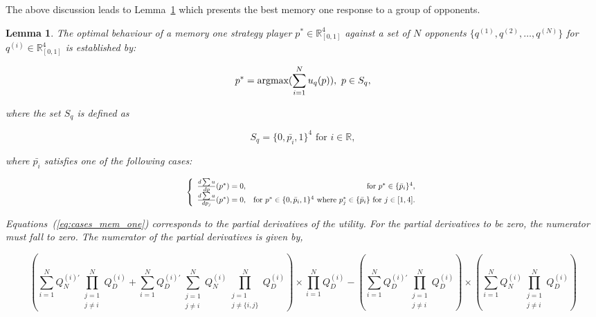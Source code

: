 \documentclass[10pt]{article}
\newcommand{\R}{\mathbb{R}}
\newtheorem{lemma}[theorem]{Lemma}
\begin{document}
The above discussion leads to Lemma~\ref{lemma:memone_group_best_response} which
presents the best memory one response to a group of opponents.

\begin{lemma}\label{lemma:memone_group_best_response}
    The optimal behaviour of a memory one strategy player \(p^* \in \R_{[0, 1]} ^ 4\)
    against a set of \(N\) opponents \(\{q^{(1)}, q^{(2)}, \dots, q^{(N)} \}\)
    for \(q^{(i)} \in \R_{[0, 1]} ^ 4\) is established by:
    
    \[p^* = \textnormal{argmax}(\sum\limits_{i=1} ^ N  u_q(p)), \ p \in S_q,\]
    
    where the set \(S_q\) is defined as 
    
    \[S_q = \{0, \bar{p_i}, 1 \}^4 \text{ for } i \in \R,\]
    
    where \(\bar{p_i}\) satisfies one of the following cases:

    \begin{equation}\label{eq:cases_mem_one}\resizebox{.7\hsize}{!}{$
        \left\{\begin{array}{lr}
        \frac{d\sum u}{dp} (p^*) = 0, & \text{for } p^* \in \{\bar{p}_i\} ^ 4, \\
        \frac{d\sum u}{dp_j} (p^*) = 0, & \text{for } p^* \in \{0, \bar{p}_i, 1\} ^ 4
        \text{ where } p_j ^ * \in \{\bar{p}_i\} \text{ for } j \in [1, 4].\\
        \end{array}\right.$}
    \end{equation}

    Equations~(\ref{eq:cases_mem_one}) corresponds to the partial derivatives of the
    utility. For the partial derivatives to be zero, the numerator must fall
    to zero. The numerator of the partial derivatives is given by,

    \begin{equation}\label{eq:group_derivative_numerator_condition}
    (\sum\limits_{i=1} ^ {N} Q_{N}^{(i)'} \prod_{\substack{j=1 \\ j \neq i}} ^ N Q_{D}^{(i)}
     + \sum\limits_{i=1} ^ {N} Q_{D}^{(i)'} \sum_{\substack{j=1 \\ j \neq i}} ^ {N} Q_{N}^{(i)}
    \prod_{\substack{j=1 \\ j \neq \{i, j\}}} ^ N Q_{D}^{(i)}) \times
    \prod\limits_{i=1} ^ N Q_{D}^{(i)} - (\sum\limits_{i=1} ^ {N} Q_{D}^{(i)'}
    \prod_{\substack{j=1 \\ j \neq i}} ^ N Q_{D}^{(i)}) \times 
    (\sum\limits_{i=1} ^ {N} Q_{N}^{(i)} \prod_{\substack{j=1 \\ j \neq i}} ^ N Q_{D}^{(i)})
    \end{equation}


\end{lemma}
\end{document}
